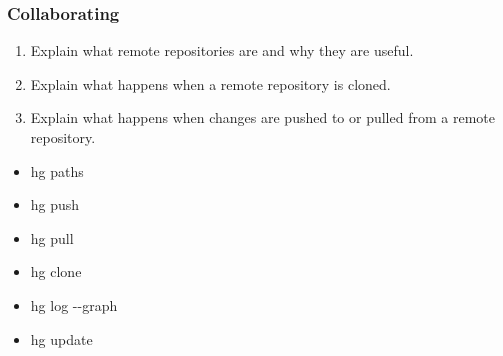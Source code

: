 \documentclass[xcolor=dvipsnames]{beamer}
\renewcommand{\dh}{{-}{-}}
\begin{document}
\begin{frame}
\frametitle{Collaborating}
\begin{enumerate}
  \item Explain what remote repositories are and why they are useful.
  \item Explain what happens when a remote repository is cloned.
  \item Explain what happens when changes are pushed to or pulled from a remote repository.
\end{enumerate}
\begin{multicols}{2}
\begin{itemize}
  \item hg paths
  \item hg push
  \item hg pull
  \item hg clone
  \item hg log \dh graph
  \item hg update
\end{itemize}
\end{multicols}
\end{frame}
\end{document}
